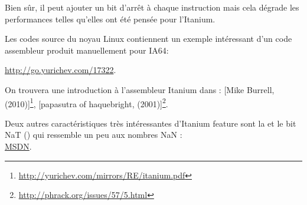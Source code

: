 Bien sûr, il peut ajouter un bit d'arrêt à chaque instruction mais cela dégrade les performances 
telles qu'elles ont été pensée pour l'Itanium.

Les codes source du noyau Linux contiennent un exemple intéressant d'un code assembleur produit 
manuellement pour \ac{IA64}:

\url{http://go.yurichev.com/17322}.

On trouvera une introduction à l'assembleur Itanium dans :
[Mike Burrell,  (2010)]\footnote{\AlsoAvailableAs \url{http://yurichev.com/mirrors/RE/itanium.pdf}},
[papasutra of haquebright,  (2001)]\footnote{\AlsoAvailableAs \url{http://phrack.org/issues/57/5.html}}.

Deux autres caractéristiques très intéressantes d'Itanium feature sont la  
et le bit NaT () qui ressemble un peu aux nombres \gls{NaN} : \\
\href{http://go.yurichev.com/17323}{MSDN}.

